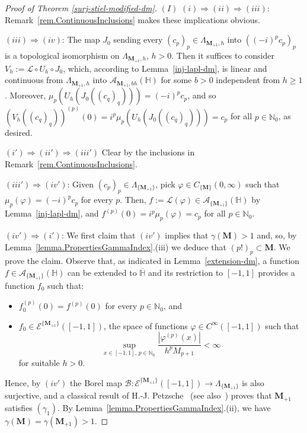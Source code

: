 \documentclass[12pt,a4paper]{article}
\newcommand{\N}{\mathbb{N}}
\newcommand{\HH}{\mathbb{H}}
\newcommand{\M}{{\boldsymbol{M}}}
\newcommand{\ga}{\gamma}
\theoremstyle{plain}
\theoremstyle{definition}
\numberwithin{equation}{section}
\begin{document}
\begin{proof}[Proof of Theorem \ref{surj-stiel-modified-dm}]
$(I)$ $(i) \Rightarrow (ii) \Rightarrow (iii)$: Remark~\ref{rem.ContinuousInclusions} makes these implications obvious.

$(iii) \Rightarrow (iv)$: The map $J_0$ sending every $(c_p)_{p} \in \Lambda_{\M_{+1},h}$ into $((-i)^pc_p)_p$ is a topological isomorphism on $\Lambda_{\M_{+1},h}$, $h>0$. Then it suffices to consider $V_h:=\mathcal{L}\circ U_h \circ J_0$, which, according to Lemma~\ref{inj-lapl-dm}, is linear and continuous from $\Lambda_{\M_{+1},h}$ into $\mathcal{A}_{\M_{+1},bh}(\HH)$ for some $b>0$ independent from $h\ge 1$. Moreover,
$\mu_p(U_h(J_0((c_q)_q))) = (-i)^pc_p$, and so $(V_h((c_q)_q))^{(p)}(0) = i^p \mu_p(U_h(J_0((c_q)_q))) = c_p$ for all $p \in \N_0$, as desired.

$(i') \Rightarrow (ii') \Rightarrow (iii')$ Clear by the inclusions in Remark~\ref{rem.ContinuousInclusions}.

$(iii') \Rightarrow (iv')$: Given $(c_p)_{p} \in \Lambda_{\{\M_{+1}\}}$, pick $\varphi\in C_{\{\M\}}(0,\infty)$ such that $\mu_p(\varphi)=(-i)^pc_p$ for every $p$. Then, $f:=\mathcal{L}(\varphi)\in\mathcal{A}_{\{\M_{+1}\}}(\HH)$ by Lemma~\ref{inj-lapl-dm}, and $f^{(p)}(0) = i^p \mu_p(\varphi) = c_p$ for all $p \in \N_0$.

$(iv') \Rightarrow (i')$: We first claim that $(iv')$ implies that $\ga(\M)>1$ and, so, by Lemma~\ref{lemma.PropertiesGammaIndex}.(iii) we deduce that $(p!)_p\subset\M$. We prove the claim. Observe that, as indicated in Lemma~\ref{extension-dm}, a function $f\in\mathcal{A}_{\{\M_{+1}\}}(\HH)$ can be extended to $\overline{\HH}$ and its restriction to $[-1,1]$ provides a function $f_0$ such that:
\begin{itemize}
\item[(a)] $f_0^{(p)}(0)=f^{(p)}(0)$ for every $p\in\N_0$, and
\item[(b)] $f_0\in\mathcal{E}^{\{\M_{+1}\}}([-1,1])$, the space of functions $\varphi\in C^{\infty}([-1,1])$ such that
    $$
    \sup_{x\in[-1,1],\,p\in\N_0} \frac{|\varphi^{(p)}(x)|}{h^pM_{p+1}}<\infty
    $$
    for suitable $h>0$.
\end{itemize}
Hence, by $(iv')$ the Borel map $\mathcal{B}\colon\mathcal{E}^{\{\M_{+1}\}}([-1,1])\to \Lambda_{\{\M_{+1}\}}$ is also surjective, and a classical result of H.-J. Petzsche~\cite[Thm. 3.5]{Petzsche88} (see also~\cite[Thm. 4.4]{JG-S-S}) proves that $\M_{+1}$ satisfies $(\ga_1)$. By Lemma~\ref{lemma.PropertiesGammaIndex}.(ii), we have $\ga(\M)=\ga(\M_{+1})>1$.


\end{proof}
\end{document}
